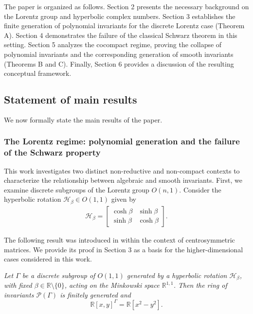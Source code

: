 \documentclass[]{article}
\begin{document}
The paper is organized as follows. Section 2 presents the necessary background on the Lorentz group and hyperbolic complex numbers. Section 3 establishes the finite generation of polynomial invariants for the discrete Lorentz case (Theorem A). Section 4 demonstrates the failure of the classical Schwarz theorem in this setting. Section 5 analyzes the cocompact regime, proving the collapse of polynomial invariants and the corresponding generation of smooth invariants (Theorems B and C). Finally, Section 6 provides a discussion of the resulting conceptual framework.

\subsection{Statement of main results}

We now formally state the main results of the paper.

\subsubsection{The Lorentz regime: polynomial generation and the failure of the Schwarz property}

This work investigates two distinct non-reductive and non-compact contexts to characterize the relationship between algebraic and smooth invariants. First, we examine discrete subgroups of the Lorentz group $O(n,1)$. Consider the hyperbolic rotation $\mathcal{H}_\beta \in O(1,1)$ given by
\begin{eqnarray} \label{matrizhb}
	\mathcal{H}_\beta = \begin{bmatrix}
		\cosh \beta & \sinh \beta \\
		\sinh \beta & \cosh \beta 
	\end{bmatrix}.
\end{eqnarray}

The following result was introduced in \cite{manoel2025affine} within the context of centrosymmetric matrices. We provide its proof in Section 3 as a basis for the higher-dimensional cases considered in this work.

\cite{manoel2025affine}
	{\it Let $\Gamma$ be a discrete subgroup of $O(1,1)$ generated by a hyperbolic rotation $\mathcal{H}_\beta$, with fixed $\beta \in \mathbb{R} \setminus \{0\}$, acting on the Minkowski space $\mathbb{R}^{1,1}$. Then the ring of invariants $\mathcal{P}(\Gamma)$ is finitely generated and}
	$$\mathbb{R}[x,y]^\Gamma = \mathbb{R}[x^2 - y^2].$$
\end{document}
